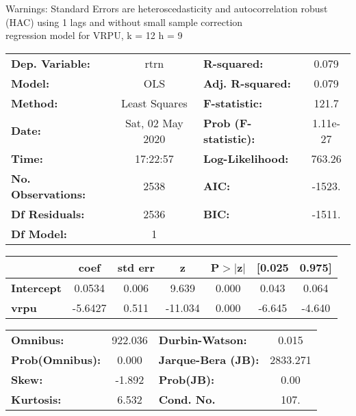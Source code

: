 Warnings: \newline
 [1] Standard Errors are heteroscedasticity and autocorrelation robust (HAC) using 1 lags and without small sample correction\\ 

regression model for VRPU, k = 12 h = 9\begin{center}
\begin{tabular}{lclc}
\toprule
\textbf{Dep. Variable:}    &       rtrn       & \textbf{  R-squared:         } &     0.079   \\
\textbf{Model:}            &       OLS        & \textbf{  Adj. R-squared:    } &     0.079   \\
\textbf{Method:}           &  Least Squares   & \textbf{  F-statistic:       } &     121.7   \\
\textbf{Date:}             & Sat, 02 May 2020 & \textbf{  Prob (F-statistic):} &  1.11e-27   \\
\textbf{Time:}             &     17:22:57     & \textbf{  Log-Likelihood:    } &    763.26   \\
\textbf{No. Observations:} &        2538      & \textbf{  AIC:               } &    -1523.   \\
\textbf{Df Residuals:}     &        2536      & \textbf{  BIC:               } &    -1511.   \\
\textbf{Df Model:}         &           1      & \textbf{                     } &             \\
\bottomrule
\end{tabular}
\begin{tabular}{lcccccc}
                   & \textbf{coef} & \textbf{std err} & \textbf{z} & \textbf{P$> |$z$|$} & \textbf{[0.025} & \textbf{0.975]}  \\
\midrule
\textbf{Intercept} &       0.0534  &        0.006     &     9.639  &         0.000        &        0.043    &        0.064     \\
\textbf{vrpu}      &      -5.6427  &        0.511     &   -11.034  &         0.000        &       -6.645    &       -4.640     \\
\bottomrule
\end{tabular}
\begin{tabular}{lclc}
\textbf{Omnibus:}       & 922.036 & \textbf{  Durbin-Watson:     } &    0.015  \\
\textbf{Prob(Omnibus):} &   0.000 & \textbf{  Jarque-Bera (JB):  } & 2833.271  \\
\textbf{Skew:}          &  -1.892 & \textbf{  Prob(JB):          } &     0.00  \\
\textbf{Kurtosis:}      &   6.532 & \textbf{  Cond. No.          } &     107.  \\
\bottomrule
\end{tabular}
\end{center}

